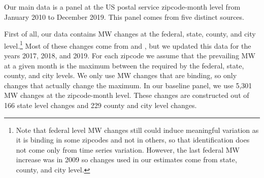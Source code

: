 
Our main data is a panel at the US postal service zipcode-month level from January 2010 to December 
2019. This panel comes from five distinct sources.

First of all, our data contains MW changes at the federal, state, county, and city level.\footnote{
	Note that federal level MW changes still could induce meaningful variation as it is binding in 
	some zipcodes and not in others, so that identification does not come only from time series 
	variation. However, the last federal MW increase was in 2009 so changes used in our estimates come 
	from state, county, and city level.} 
Most of these changes come from \textcite{vaghul2016historical} and \textcite{cengiz2019effect}, but 
we updated this data for the years 2017, 2018, and 2019. For each zipcode we assume that the prevailing 
MW at a given month is the maximum between the required by the federal, state, county, and city levels. 
We only use MW changes that are binding, so only changes that actually change the maximum. In our 
baseline panel, we use 5,301 MW changes at the zipcode-month level. These changes are constructed out 
of 166 state level changes and 229 county and city level changes.


